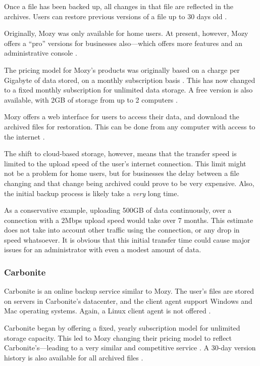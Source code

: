 Once a file has been backed up, all changes in that file are reflected in the
archives. Users can restore previous versions of a file up to 30 days
old \cite{Mozy}.

Originally, Mozy was only available for home users. At present, however, Mozy
offers a ``pro'' versions for businesses also---which offers more features and
an administrative console \cite{Mozy-crunchbase}.

The pricing model for Mozy's products was originally based on a charge per
Gigabyte of data stored, on a monthly subscription
basis \cite{Carbonite-report}. This has now changed to a fixed monthly
subscription for unlimited data storage. A free version is also available, with
2GB of storage from up to 2 computers \cite{Mozy}.

Mozy offers a web interface for users to access their data, and download the
archived files for restoration. This can be done from any computer with access
to the internet \cite{Mozy}.

The shift to cloud-based storage, however, means that the transfer speed is
limited to the upload speed of the user's internet connection. This limit might
not be a problem for home users, but for businesses the delay between a file
changing and that change being archived could prove to be very expensive. Also,
the initial backup process is likely take a \emph{very} long time.

As a conservative example, uploading 500GB of data continuously, over
a connection with a 2Mbps upload speed would take over 7 months. This estimate
does not take into account other traffic using the connection, or any drop in
speed whatsoever. It is obvious that this initial transfer time could cause
major issues for an administrator with even a modest amount of data.

\subsubsection{Carbonite}

Carbonite is an online backup service similar to Mozy. The user's files are
stored on servers in Carbonite's datacenter, and the client agent support
Windows and Mac operating systems. Again, a Linux client agent is not
offered \cite{Carbonite}.

Carbonite began by offering a fixed, yearly subscription model for unlimited
storage capacity. This led to Mozy changing their pricing model to reflect
Carbonite's---leading to a very similar and competitive
service \cite{Carbonite-report}. A 30-day version history is also available for
all archived files \cite{Carbonite}.

